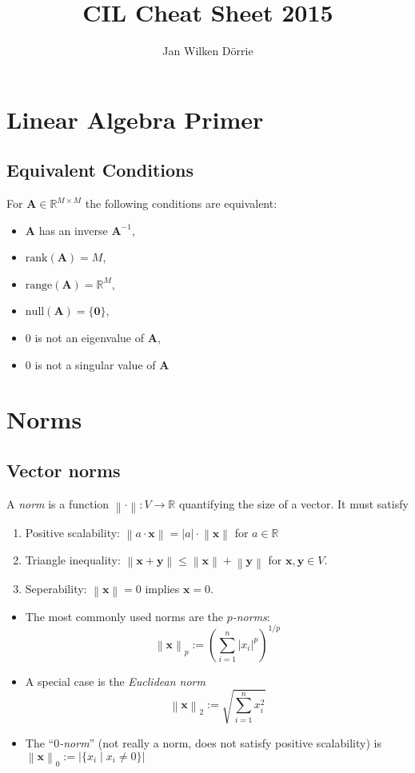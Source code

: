 \documentclass[conference,11pt]{IEEEtran}
\newcommand{\card}[1]{\left\lvert#1\right\rvert}
\newcommand{\abs}[1]{\left\lvert#1\right\rvert}
\newcommand{\norm}[1]{\left\lVert#1\right\rVert}
\newcommand{\matr}[1]{\boldsymbol{\mathbf{#1}}}
\newcommand{\vect}[1]{\boldsymbol{\mathbf{#1}}}
\newcommand{\R}{\mathbb{R}}
\begin{document}
\title{CIL Cheat Sheet 2015}
\author{Jan Wilken D\"orrie}
\maketitle

\section{Linear Algebra Primer}
\subsection{Equivalent Conditions}
For $\matr{A} \in \R^{M \times M}$ the following conditions
are equivalent:
\begin{itemize}
  \item $\matr{A}$ has an inverse $\matr{A}^{-1}$,
  \item $\mathrm{rank}(\matr{A}) = M$,
  \item $\mathrm{range}(\matr{A}) = \R^M$,
  \item $\mathrm{null}(\matr{A}) = \{\vect{0}\}$,
  \item $0$ is not an eigenvalue of $\matr{A}$,
  \item $0$ is not a singular value of $\matr{A}$
\end{itemize}


\section{Norms}
\subsection{Vector norms}
A \emph{norm} is a function $\norm{\cdot} : V \to \R$ quantifying the
size of a vector. It must satisfy
\begin{enumerate}
  \item Positive scalability: $\norm{a \cdot \vect{x}} = \abs{a} \cdot
    \norm{\vect{x}}$ for $a \in \R$
  \item Triangle inequality: $\norm{\vect{x} + \vect{y}} \leq
    \norm{\vect{x}} + \norm{\vect{y}}$ for $\vect{x}, \vect{y} \in V$.
  \item Seperability: $\norm{\vect{x}} = 0$ implies $\vect{x} = 0$.
\end{enumerate}

\begin{itemize}
  \item The most commonly used norms are the \emph{$p$-norms}:
    \[
      \norm{\vect{x}}_p := {\left(\sum_{i=1}^n \abs{x_i}^p \right)}^{1/p}
    \]
  \item A special case is the \emph{Euclidean norm}
    \[ \norm{\vect{x}}_2 := \sqrt{\sum_{i=1}^n x_i^2} \]
  \item The ``\emph{$0$-norm}'' (not really a norm, does not satisfy positive
    scalability) is \( \norm{\vect{x}}_0 := \card{\{x_i \mid x_i \neq 0\}} \)
\end{itemize}
\end{document}
